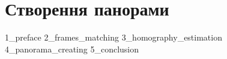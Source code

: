 \chapter{Створення панорами}
{1_preface}
{2_frames_matching}
{3_homography_estimation}
{4_panorama_creating}
{5_conclusion}
